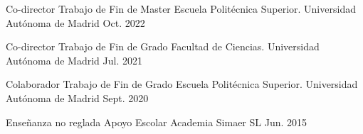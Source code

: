 \begin{cventries}
    
  \cventry
    {Co-director} %
    {Trabajo de Fin de Master} %
    {Escuela Politécnica Superior. Universidad Autónoma de Madrid} %
    {Oct. 2022} %
    {
      \begin{cvitems} %
        \item {}
      \end{cvitems}
    }

  \cventry
    {Co-director} %
    {Trabajo de Fin de Grado} %
    {Facultad de Ciencias. Universidad Autónoma de Madrid} %
    {Jul. 2021} %
    {
      \begin{cvitems} %
        \item {
        }
      \end{cvitems}
    }
    
  \cventry
    {Colaborador} %
    {Trabajo de Fin de Grado} %
    {Escuela Politécnica Superior. Universidad Autónoma de Madrid} %
    {Sept. 2020} %
    {
      \begin{cvitems} %
        \item {}
      \end{cvitems}
    }

  \cventry
    {Enseñanza no reglada} %
    {Apoyo Escolar} %
    {Academia Simaer SL} %
    {Jun. 2015} %
    {}
\end{cventries}